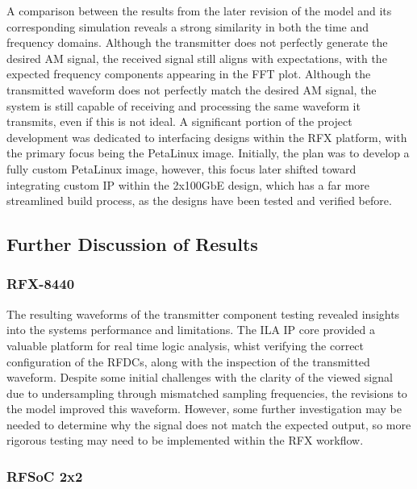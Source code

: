 \documentclass[12pt, a4paper]{article}
\begin{document}
A comparison between the results from the later revision of the model and its corresponding simulation reveals a strong similarity in both the time and frequency domains. Although the transmitter does not perfectly generate the desired AM signal, the received signal still aligns with expectations, with the expected frequency components appearing in the FFT plot. Although the transmitted waveform does not perfectly match the desired AM signal, the system is still capable of receiving and processing the same waveform it transmits, even if this is not ideal. A significant portion of the project development was dedicated to interfacing designs within the RFX platform, with the primary focus being the PetaLinux image. Initially, the plan was to develop a fully custom PetaLinux image, however, this focus later shifted toward integrating custom IP within the 2x100GbE design, which has a far more streamlined build process, as the designs have been tested and verified before.

\subsection{Further Discussion of Results}
\subsubsection{RFX-8440}

The resulting waveforms of the transmitter component testing revealed insights into the systems performance and limitations. The ILA IP core provided a valuable platform for real time logic analysis, whist verifying the correct configuration of the RFDCs, along with the inspection of the transmitted waveform. Despite some initial challenges with the clarity of the viewed signal due to undersampling through mismatched sampling frequencies, the revisions to the model improved this waveform. However, some further investigation may be needed to determine why the signal does not match the expected output, so more rigorous testing may need to be implemented within the RFX workflow. 

\subsubsection{RFSoC 2x2}
\end{document}
